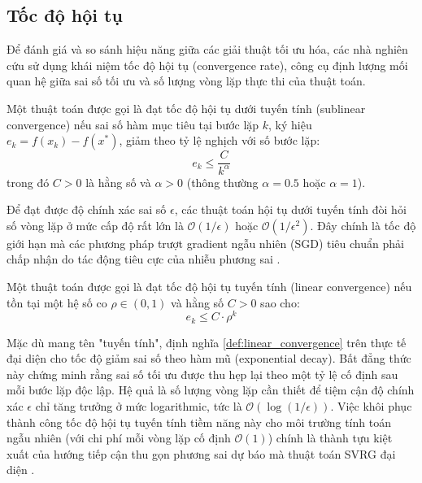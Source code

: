 \subsection{Tốc độ hội tụ}

Để đánh giá và so sánh hiệu năng giữa các giải thuật tối ưu hóa, các nhà nghiên cứu sử dụng khái niệm tốc độ hội tụ (convergence rate), công cụ định lượng mối quan hệ giữa sai số tối ưu và số lượng vòng lặp thực thi của thuật toán.

\begin{definition}
\label{def:sublinear_convergence}
Một thuật toán được gọi là đạt tốc độ hội tụ dưới tuyến tính (sublinear convergence) nếu sai số hàm mục tiêu tại bước lặp $k$, ký hiệu $e_k = f(x_k) - f(x^*)$, giảm theo tỷ lệ nghịch với số bước lặp:
\begin{equation}
e_k \le \frac{C}{k^\alpha}
\end{equation}
trong đó $C > 0$ là hằng số và $\alpha > 0$ (thông thường $\alpha = 0.5$ hoặc $\alpha = 1$).
\end{definition}

Để đạt được độ chính xác sai số $\epsilon$, các thuật toán hội tụ dưới tuyến tính đòi hỏi số vòng lặp ở mức cấp độ rất lớn là $\mathcal{O}(1/\epsilon)$ hoặc $\mathcal{O}(1/\epsilon^2)$. Đây chính là tốc độ giới hạn mà các phương pháp trượt gradient ngẫu nhiên (SGD) tiêu chuẩn phải chấp nhận do tác động tiêu cực của nhiễu phương sai \cite{johnson2013accelerating}.

\begin{definition}
\label{def:linear_convergence}
Một thuật toán được gọi là đạt tốc độ hội tụ tuyến tính (linear convergence) nếu tồn tại một hệ số co $\rho \in (0, 1)$ và hằng số $C > 0$ sao cho:
\begin{equation}
e_k \le C \cdot \rho^k
\end{equation}
\end{definition}

Mặc dù mang tên "tuyến tính", định nghĩa \ref{def:linear_convergence} trên thực tế đại diện cho tốc độ giảm sai số theo hàm mũ (exponential decay). Bất đẳng thức này chứng minh rằng sai số tối ưu được thu hẹp lại theo một tỷ lệ cố định sau mỗi bước lặp độc lập. Hệ quả là số lượng vòng lặp cần thiết để tiệm cận độ chính xác $\epsilon$ chỉ tăng trưởng ở mức logarithmic, tức là $\mathcal{O}(\log(1/\epsilon))$. Việc khôi phục thành công tốc độ hội tụ tuyến tính tiềm năng này cho môi trường tính toán ngẫu nhiên (với chi phí mỗi vòng lặp cố định $\mathcal{O}(1)$) chính là thành tựu kiệt xuất của hướng tiếp cận thu gọn phương sai dự báo mà thuật toán SVRG đại diện \cite{johnson2013accelerating}.

